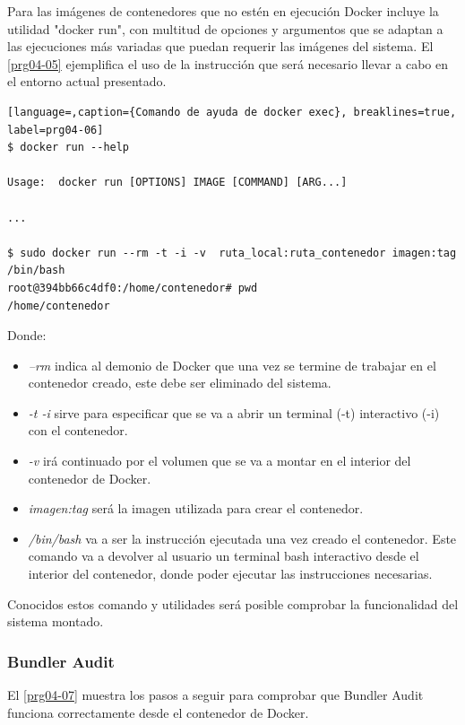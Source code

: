 Para las imágenes de contenedores que no estén en ejecución Docker incluye la utilidad "docker run", con multitud de opciones y argumentos que se adaptan a las ejecuciones más variadas que puedan requerir las imágenes del sistema. El \autoref{prg04-05} ejemplifica el uso de la instrucción que será necesario llevar a cabo en el entorno actual presentado.

\begin{lstlisting}[language=,caption={Comando de ayuda de docker exec}, breaklines=true, label=prg04-06]
$ docker run --help

Usage:	docker run [OPTIONS] IMAGE [COMMAND] [ARG...]

...

$ sudo docker run --rm -t -i -v  ruta_local:ruta_contenedor imagen:tag /bin/bash
root@394bb66c4df0:/home/contenedor# pwd
/home/contenedor
\end{lstlisting}

Donde:

\begin{itemize}
	\item \textit{--rm} indica al demonio de Docker que una vez se termine de trabajar en el contenedor creado, este debe ser eliminado del sistema.
	\item \textit{-t -i} sirve para especificar que se va a abrir un terminal (-t) interactivo (-i) con el contenedor.
	\item \textit{-v} irá continuado por el volumen que se va a montar en el interior del contenedor de Docker.
	\item \textit{imagen:tag} será la imagen utilizada para crear el contenedor.
	\item \textit{/bin/bash} va a ser la instrucción ejecutada una vez creado el contenedor. Este comando va a devolver al usuario un terminal bash interactivo desde el interior del contenedor, donde poder ejecutar las instrucciones necesarias.
\end{itemize}

Conocidos estos comando y utilidades será posible comprobar la funcionalidad del sistema montado.

\subsubsection{Bundler Audit}

El \autoref{prg04-07} muestra los pasos a seguir para comprobar que Bundler Audit funciona correctamente desde el contenedor de Docker.

